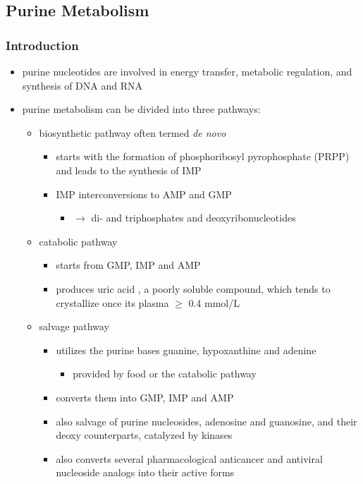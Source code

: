 \documentclass{scrartcl}
\begin{document}
\subsection{Purine Metabolism}
\label{sec:orge71b399}
\subsubsection{Introduction}
\label{sec:org64be1f0}
\begin{itemize}
\item purine nucleotides are involved in energy transfer, metabolic
regulation, and synthesis of DNA and RNA
\item purine metabolism can be divided into three pathways:
\begin{itemize}
\item biosynthetic pathway often termed \emph{de novo}
\begin{itemize}
\item starts with the formation of phosphoribosyl pyrophosphate (PRPP)
and leads to the synthesis of IMP
\item IMP interconversions to AMP and GMP
\begin{itemize}
\item \(\to\) di- and triphosphates and deoxyribonucleotides
\end{itemize}
\end{itemize}
\item catabolic pathway
\begin{itemize}
\item starts from GMP, IMP and AMP
\item produces uric acid , a poorly soluble compound, which tends to
crystallize once its plasma \(\ge\) 0.4 mmol/L
\end{itemize}
\item salvage pathway
\begin{itemize}
\item utilizes the purine bases guanine, hypoxanthine and adenine
\begin{itemize}
\item provided by food or the catabolic pathway
\end{itemize}
\item converts them into GMP, IMP and AMP
\item also salvage of purine nucleosides, adenosine and guanosine, and
their deoxy counterparts, catalyzed by kinases
\item also converts several pharmacological anticancer and antiviral
nucleoside analogs into their active forms
\end{itemize}
\end{itemize}


\end{itemize}
\end{document}
